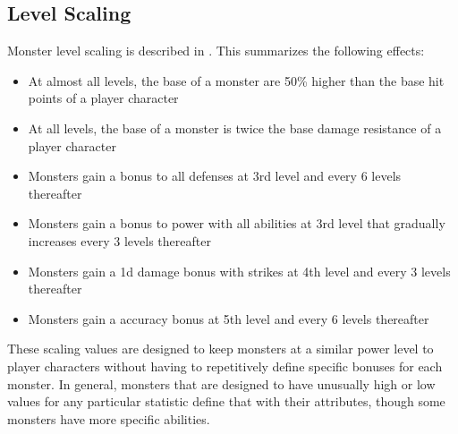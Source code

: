     \subsection{Level Scaling}
        Monster level scaling is described in .
        This summarizes the following effects:
        \begin{itemize}
            \item At almost all levels, the base  of a monster are 50\% higher than the base hit points of a player character
            \item At all levels, the base  of a monster is twice the base damage resistance of a player character
            \item Monsters gain a  bonus to all defenses at 3rd level and every 6 levels thereafter
            \item Monsters gain a  bonus to power with all abilities at 3rd level that gradually increases every 3 levels thereafter
            \item Monsters gain a \plus1d damage bonus with strikes at 4th level and every 3 levels thereafter
            \item Monsters gain a  accuracy bonus at 5th level and every 6 levels thereafter
        \end{itemize}
        These scaling values are designed to keep monsters at a similar power level to player characters without having to repetitively define specific bonuses for each monster.
        In general, monsters that are designed to have unusually high or low values for any particular statistic define that with their attributes, though some monsters have more specific abilities.

